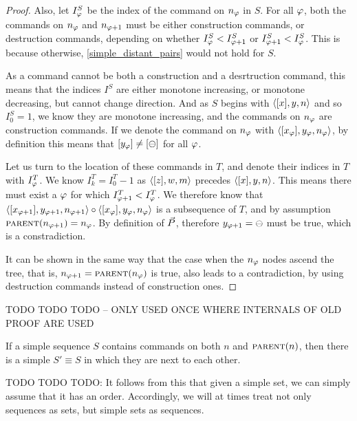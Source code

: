 \begin{proof}
Also, let $I^S_\varphi$ be the index of the command on $n_\varphi$ in $S$.
For all $\varphi$, both the commands on $n_\varphi$ and $n_{\varphi+1}$ must be either
construction commands, or destruction commands, depending on
whether $I^S_\varphi<I^S_{\varphi+1}$ or $I^S_{\varphi+1}<I^S_\varphi$.
This is because otherwise, \cref{simple_distant_pairs} would not hold for $S$.

As a command cannot be both a construction and a desrtruction command,
this means that the indices $I^S$ are either monotone increasing, or monotone
decreasing, but cannot change direction.
And as $S$ begins with $\langle{[x],y,n}\rangle$ and so $I^S_0=1$, we know they are monotone increasing,
and the commands on $n_\varphi$ are construction commands.
If we denote the command on $n_\varphi$ with $\langle{[x_\varphi],y_\varphi,n_\varphi}\rangle$,
by definition this means that $[y_\varphi]\neq[\ominus]$ for all $\varphi$.

Let us turn to the location of these commands in $T$,
and denote their indices in $T$ with $I^T_\varphi$.
We know $I^T_k=I^T_0-1$ as $\langle{[z],w,m}\rangle$ precedes $\langle{[x],y,n}\rangle$.
This means there must exist a $\varphi$ for which $I^T_{\varphi+1}<I^T_\varphi$.
We therefore know that
$\langle{[x_{\varphi+1}],y_{\varphi+1},n_{\varphi+1}}\rangle \circ \langle{[x_\varphi],y_\varphi,n_\varphi}\rangle$
is a subsequence of $T$, and by assumption $\text{\normalfont\scshape{parent}}(n_{\varphi+1})=n_\varphi$.
By definition of $\vec{P}$, therefore $y_{\varphi+1}=\ominus$ must be true,
which is a constradiction.

It can be shown in the same way
that the case when the $n_\varphi$ nodes ascend the tree,
that is, $n_{\varphi+1}=\text{\normalfont\scshape{parent}}(n_\varphi)$ is true, also leads to a contradiction,
by using destruction commands instead of construction ones.
\end{proof}






TODO TODO TODO -- ONLY USED ONCE WHERE INTERNALS OF OLD PROOF ARE USED
\begin{mycor}\label{lemma:neighbor}
If a simple sequence $S$ contains commands on both $n$ and $\text{\normalfont\scshape{parent}}(n)$, then
there is a simple $S'\equiv S$ in which they are next to each other.
\end{mycor}



TODO TODO TODO:
It follows from this that given a simple set,
we can simply assume that it has an order.
Accordingly, we will at times treat not only sequences as sets,
but simple sets as sequences.

